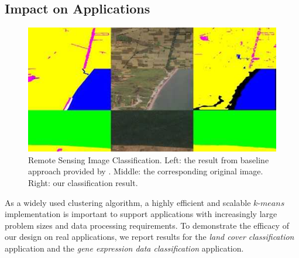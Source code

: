 \documentclass[10pt,journal,compsoc]{IEEEtran}
\begin{document}



\subsection{Impact on Applications}\label{applications}

\begin{figure}
\centering
\includegraphics[scale=0.40]{lc1.jpg}
\caption{Remote Sensing Image Classification. Left: the result from baseline approach provided by \cite{demir2018deepglobe}. Middle: the corresponding original image. Right: our classification result. 
}
\label{lc}
\end{figure}

As a widely used clustering algorithm, a highly efficient and scalable $k$-$means$ implementation is important to support applications with increasingly large problem sizes and data processing requirements. 
To demonstrate the efficacy of our design on real applications, we report results for the \textit{land cover classification} application and the \textit{gene expression data classification} application. 
\end{document}
